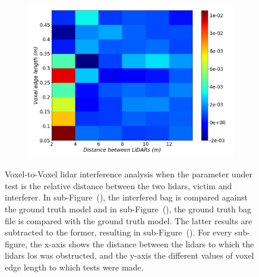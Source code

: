 \begin{figure}[!ht]
\begin{subfigure}[c]{0.45\textwidth}
	\label{fig:los:octree-ground-truth-color-mesh}
\end{subfigure}
\\ \vspace{4mm}
\begin{subfigure}[c]{0.6\textwidth}
	\includegraphics[width=\textwidth]{img/lidar-interference/LOS/octree_difference_color_mesh.png}
	\caption{}%
	\label{fig:los:octree-difference-color-mesh}
\end{subfigure}

\caption[Voxel-to-Voxel analysis when the \acp{lidar} \acs{los} is obstructed and the distance between \acp{lidar} is variated.]{Voxel-to-Voxel \ac{lidar} interference analysis when the parameter under test is the relative distance between the two \acp{lidar}, victim and interferer. In sub-Figure~(), the interfered bag is compared against the ground truth model and in sub-Figure~(), the ground truth bag file is compared with the ground truth model. The latter results are subtracted to the former, resulting in sub-Figure~(). For every sub-figure, the x-axis shows the distance between the \acp{lidar} to which the \acp{lidar} \ac{los} was obstructed, and the y-axis the different values of voxel edge length to which tests were made.}
\label{fig:los:octree-color-mesh}
\end{figure}

